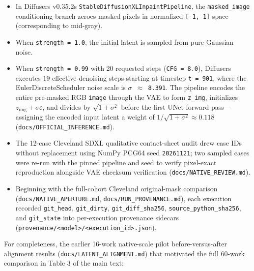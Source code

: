 \documentclass[11pt,a4paper]{article}
\providecommand{\tightlist}{\setlength{\itemsep}{0pt}\setlength{\parskip}{0pt}}
\begin{document}
\begin{itemize}
\tightlist
\item
  In Diffusers v0.35.2\textquotesingle s \texttt{StableDiffusionXLInpaintPipeline}, the \texttt{masked\_image} conditioning branch zeroes masked pixels in normalized \texttt{{[}-1,\ 1{]}} space (corresponding to mid-gray).
\item
  When \texttt{strength\ =\ 1.0}, the initial latent is sampled from pure Gaussian noise.
\item
  When \texttt{strength\ =\ 0.99} with 20 requested steps (\texttt{CFG\ =\ 8.0}), Diffusers executes 19 effective denoising steps starting at timestep \texttt{t\ =\ 901}, where the EulerDiscreteScheduler noise scale is \texttt{\ensuremath{\sigma}\ \ensuremath{\approx}\ 8.391}. The pipeline encodes the entire pre-masked RGB \texttt{image} through the VAE to form \texttt{z\_img}, initializes \(z_{\mathrm{img}}+\sigma\varepsilon\), and divides by \(\sqrt{1+\sigma^2}\) before the first UNet forward pass---assigning the encoded input latent a weight of \(1/\sqrt{1+\sigma^2}\approx 0.118\) (\nolinkurl{docs/OFFICIAL_INFERENCE.md}).
\item
  The 12-case Cleveland SDXL qualitative contact-sheet audit drew case IDs without replacement using NumPy PCG64 seed \texttt{20261121}; two sampled cases were re-run with the pinned pipeline and seed to verify pixel-exact reproduction alongside VAE checksum verification (\nolinkurl{docs/NATIVE_REVIEW.md}).
\item
  Beginning with the full-cohort Cleveland original-mask comparison (\nolinkurl{docs/NATIVE_APERTURE.md}, \nolinkurl{docs/RUN_PROVENANCE.md}), each execution recorded \texttt{git\_head}, \texttt{git\_dirty}, \nolinkurl{git_diff_sha256}, \nolinkurl{source_python_sha256}, and \texttt{git\_state} into per-execution provenance sidecars (\nolinkurl{provenance/<model>/<execution_id>.json}).
\end{itemize}
\clearpage
For completeness, the earlier 16-work native-scale pilot before-versus-after alignment results (\nolinkurl{docs/LATENT_ALIGNMENT.md}) that motivated the full 60-work comparison in Table 3 of the main text:
\end{document}
